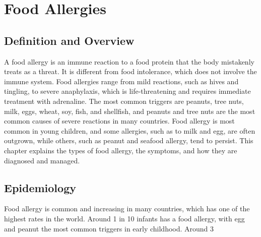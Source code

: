 \chapter{Food Allergies}

\section*{Definition and Overview}
A food allergy is an immune reaction to a food protein that the body mistakenly treats as a threat. It is different from food intolerance, which does not involve the immune system. Food allergies range from mild reactions, such as hives and tingling, to severe anaphylaxis, which is life-threatening and requires immediate treatment with adrenaline. The most common triggers are peanuts, tree nuts, milk, eggs, wheat, soy, fish, and shellfish, and peanuts and tree nuts are the most common causes of severe reactions in many countries. Food allergy is most common in young children, and some allergies, such as to milk and egg, are often outgrown, while others, such as peanut and seafood allergy, tend to persist. This chapter explains the types of food allergy, the symptoms, and how they are diagnosed and managed.

\section*{Epidemiology}
Food allergy is common and increasing in many countries, which has one of the highest rates in the world. Around 1 in 10 infants has a food allergy, with egg and peanut the most common triggers in early childhood. Around 3%

